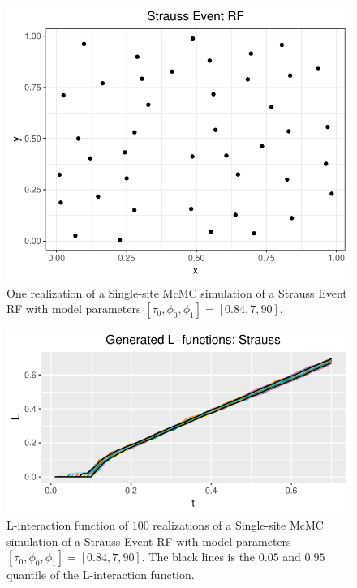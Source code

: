 \begin{figure}[H]
    \centering
    \includegraphics[scale=0.65]{figures/repulsive_event_rf.pdf}
    \caption{One realization of a Single-site McMC simulation of a Strauss Event RF with model parameters $[\tau_0,\phi_0,\phi_1] = [0.84,7,90]$.}
    \label{fig:repulsive_event_rf}
\end{figure}

\begin{figure}[H]
    \centering
    \includegraphics[scale=0.65]{figures/gen_strauss_l.pdf}
    \caption{L-interaction function of $100$ realizations of a Single-site McMC simulation of a Strauss Event RF with model parameters $[\tau_0,\phi_0,\phi_1] = [0.84,7,90]$. The black lines is the $0.05$ and $0.95$ quantile of the L-interaction function.}
    \label{fig:gen_strauss_l}
\end{figure}

